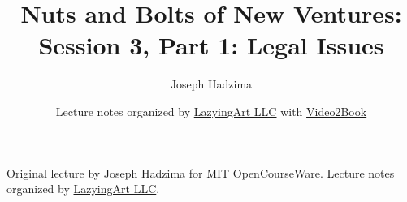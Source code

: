 \documentclass[11pt,oneside]{book}
\begin{document}
\frontmatter
\title{Nuts and Bolts of New Ventures: Session 3, Part 1: Legal Issues}
\author{Joseph Hadzima}
\date{Lecture notes organized by \href{https://lazying.art}{LazyingArt LLC} with \href{https://github.com/lachlanchen/Video2Book}{Video2Book}}
\maketitle
\begin{center}
\small Original lecture by Joseph Hadzima for MIT OpenCourseWare. Lecture notes organized by \href{https://lazying.art}{LazyingArt LLC}.
\end{center}
\clearpage
\mainmatter

\end{document}
